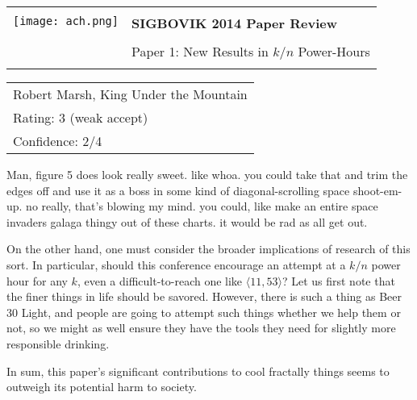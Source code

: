 \documentclass[12pt]{article}
\begin{document}
{\sffamily
\begin{tabular}{ll}
\multirow{2}{*}{\texttt{[image: ach.png]}}\\
& \textbf{\Huge{SIGBOVIK 2014 Paper Review}} \\ &\\
& \LARGE{Paper 1: New Results in $k/n$ Power-Hours} \\
&\\
\hline
\end{tabular}}
\vspace{2em}

{\large\bf
\begin{tabular}{l}
Robert Marsh, King Under the Mountain \\
Rating: 3 (weak accept) \\
Confidence: 2/4 \\
\end{tabular}}
\vspace{1em}

Man, figure 5 does look really sweet.  like whoa.  you could take that and trim the edges off and use it as a boss in some kind of diagonal-scrolling space shoot-em-up.  no really, that's blowing my mind.  you could, like make an entire space invaders galaga thingy out of these charts.  it would be rad as all get out.

On the other hand, one must consider the broader implications of research of this sort.
In particular, should this conference encourage an attempt at a $k/n$ power hour for any $k$, even a difficult-to-reach one like $\langle 11, 53\rangle$?  
Let us first note that the finer things in life should be savored.
However, there is such a thing as Beer 30 Light, and people are going to attempt such things whether we help them or not, so we might as well ensure they have the tools they need for slightly more responsible drinking.

In sum, this paper's significant contributions to cool fractally things seems to outweigh its potential harm to society.
\end{document}
